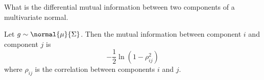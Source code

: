 






















\sstart
{}


What is the differential mutual information
between two components of a multivariate normal.


\begin{prop}
Let $g \sim \normal{\mu}{\Sigma}$.
Then the mutual information between
component $i$ and component $j$ is
\[
  -\frac{1}{2}\ln(1 - \rho_{ij}^2)
\]
where $\rho_{ij}$ is the correlation
between components $i$ and $j$.
\end{prop}
\strats
